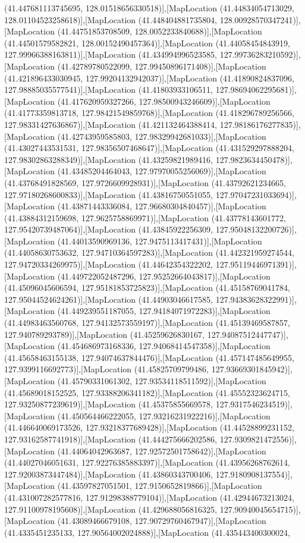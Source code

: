 (41.447681113745695, 128.01518656330518)],[MapLocation (41.44834054713029, 128.01104523258618)],[MapLocation (41.448404881735804, 128.00928570347241)],[MapLocation (41.44751853708509, 128.0052233840688)],[MapLocation (41.44501579582821, 128.00152490457364)],[MapLocation (41.44058454843919, 127.99966388163811)],[MapLocation (41.434994996523585, 127.99736283210592)],[MapLocation (41.42789780522099, 127.99450896171408)],[MapLocation (41.421896433030945, 127.99204132942037)],[MapLocation (41.41890824837096, 127.98885035577541)],[MapLocation (41.41803933106511, 127.98694062295681)],[MapLocation (41.417620959327266, 127.98500943246609)],[MapLocation (41.41773359813718, 127.98421549859768)],[MapLocation (41.418296789256566, 127.98331427636867)],[MapLocation (41.421132464388414, 127.98186176277835)],[MapLocation (41.42743959585803, 127.98329942681033)],[MapLocation (41.43027443531531, 127.98356507468647)],[MapLocation (41.431529297888204, 127.98302863288349)],[MapLocation (41.43259821989416, 127.9823634450478)],[MapLocation (41.43485204464043, 127.97970055256069)],[MapLocation (41.43768491828569, 127.9726609928931)],[MapLocation (41.43792621234665, 127.97180268600833)],[MapLocation (41.43816750551055, 127.97047231033694)],[MapLocation (41.43871443336084, 127.96680304840457)],[MapLocation (41.43884312159698, 127.9625758869971)],[MapLocation (41.43778143601772, 127.95420739487064)],[MapLocation (41.43845922256309, 127.95048132200726)],[MapLocation (41.44013590969136, 127.9475113417431)],[MapLocation (41.44058630753632, 127.94710364597283)],[MapLocation (41.442321959274544, 127.94720334269975)],[MapLocation (41.44642354322202, 127.95119446971391)],[MapLocation (41.449722052487296, 127.95252664043817)],[MapLocation (41.45096045606594, 127.95181853725823)],[MapLocation (41.45158769041784, 127.95044524624261)],[MapLocation (41.44903046617585, 127.94383628322991)],[MapLocation (41.449239551187055, 127.94184071972283)],[MapLocation (41.44983463560768, 127.94132573559197)],[MapLocation (41.45139469587857, 127.940789293789)],[MapLocation (41.45259626830167, 127.94087512447747)],[MapLocation (41.454686973168336, 127.94068414547358)],[MapLocation (41.45658463155138, 127.94074637844476)],[MapLocation (41.457147485649955, 127.9399116692773)],[MapLocation (41.45825709799486, 127.93669301845942)],[MapLocation (41.45790331061302, 127.93534118511592)],[MapLocation (41.45689018152525, 127.93388206341182)],[MapLocation (41.45552323624715, 127.93250877239619)],[MapLocation (41.45375855669578, 127.9317546234519)],[MapLocation (41.450564466222055, 127.93216231922216)],[MapLocation (41.446640069173526, 127.93218377689428)],[MapLocation (41.44528899231152, 127.93162587741918)],[MapLocation (41.444275666202586, 127.9309821472556)],[MapLocation (41.44064042963687, 127.92572501758642)],[MapLocation (41.44027046051631, 127.92276385883397)],[MapLocation (41.43956268762614, 127.92003873447484)],[MapLocation (41.43860343700406, 127.9180908137554)],[MapLocation (41.43597827051501, 127.9150652819866)],[MapLocation (41.431007282577816, 127.91298388779104)],[MapLocation (41.42944673213024, 127.91100978195608)],[MapLocation (41.429688056816325, 127.90940045654715)],[MapLocation (41.43089466679108, 127.90729760467947)],[MapLocation (41.4335451235133, 127.90564002024888)],[MapLocation (41.435443400300024, 